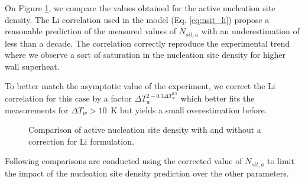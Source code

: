 On Figure \ref{fig:fullkoss_nsit}, we compare the values obtained for the active nucleation site density. The Li \etal correlation used in the model (Eq. \ref{eq:nsit_li}) propose a reasonable prediction of the measured values of $N_{sit,a}$ with an underestimation of less than a decade. The correlation correctly reproduce the experimental trend where we observe a sort of saturation in the nucleation site density for higher wall superheat.

\npar

To better match the asymptotic value of the experiment, we correct the Li \etal correlation for this case by a factor $\Delta T_{w}^{2-0.3\Delta T_{w}^{0.5}}$ which better fits the measurements for $\Delta T_{w}>10$~K but yields a small overestimation before.


\begin{figure}[!h]
\caption{Comparison of active nucleation site density with and without a correction for Li \etal formulation.}
\label{fig:fullkoss_nsit}
\end{figure}



\begin{note*}{}
Following comparisons are conducted using the corrected value of $N_{sit,a}$ to limit the impact of the nucleation site density prediction over the other parameters.
\end{note*}

